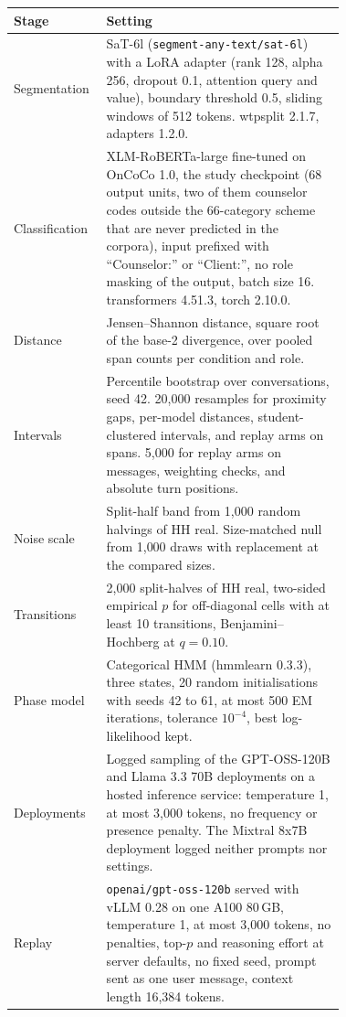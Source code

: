 \begin{tabular}{lp{0.72\linewidth}}
\toprule
Stage & Setting \\
\midrule
Segmentation & SaT-6l (\texttt{segment-any-text/sat-6l}) with a LoRA adapter (rank 128, alpha 256, dropout 0.1, attention query and value), boundary threshold 0.5, sliding windows of 512 tokens. wtpsplit 2.1.7, adapters 1.2.0. \\
Classification & XLM-RoBERTa-large fine-tuned on OnCoCo 1.0, the study checkpoint (68 output units, two of them counselor codes outside the 66-category scheme that are never predicted in the corpora), input prefixed with ``Counselor:'' or ``Client:'', no role masking of the output, batch size 16. transformers 4.51.3, torch 2.10.0. \\
Distance & Jensen--Shannon distance, square root of the base-2 divergence, over pooled span counts per condition and role. \\
Intervals & Percentile bootstrap over conversations, seed 42. 20{,}000 resamples for proximity gaps, per-model distances, student-clustered intervals, and replay arms on spans. 5{,}000 for replay arms on messages, weighting checks, and absolute turn positions. \\
Noise scale & Split-half band from 1{,}000 random halvings of HH real. Size-matched null from 1{,}000 draws with replacement at the compared sizes. \\
Transitions & 2{,}000 split-halves of HH real, two-sided empirical $p$ for off-diagonal cells with at least 10 transitions, Benjamini--Hochberg at $q=0.10$. \\
Phase model & Categorical HMM (hmmlearn 0.3.3), three states, 20 random initialisations with seeds 42 to 61, at most 500 EM iterations, tolerance $10^{-4}$, best log-likelihood kept. \\
Deployments & Logged sampling of the GPT-OSS-120B and Llama 3.3 70B deployments on a hosted inference service: temperature 1, at most 3{,}000 tokens, no frequency or presence penalty. The Mixtral 8x7B deployment logged neither prompts nor settings. \\
Replay & \texttt{openai/gpt-oss-120b} served with vLLM 0.28 on one A100 80\,GB, temperature 1, at most 3{,}000 tokens, no penalties, top-$p$ and reasoning effort at server defaults, no fixed seed, prompt sent as one user message, context length 16{,}384 tokens. \\
\bottomrule
\end{tabular}
